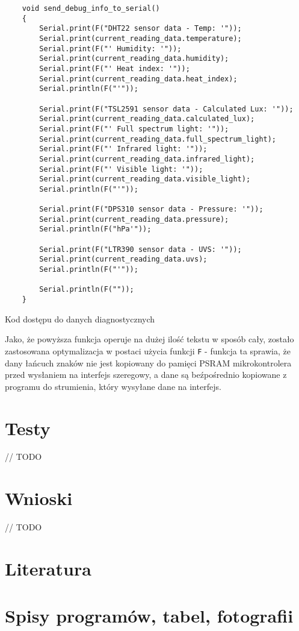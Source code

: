 \documentclass[12pt,a4paper]{article}
\begin{document}
\begin{code}[H]
\begin{verbatim}
    void send_debug_info_to_serial()
    {
        Serial.print(F("DHT22 sensor data - Temp: '"));
        Serial.print(current_reading_data.temperature);
        Serial.print(F("' Humidity: '"));
        Serial.print(current_reading_data.humidity);
        Serial.print(F("' Heat index: '"));
        Serial.print(current_reading_data.heat_index);
        Serial.println(F("'"));
    
        Serial.print(F("TSL2591 sensor data - Calculated Lux: '"));
        Serial.print(current_reading_data.calculated_lux);
        Serial.print(F("' Full spectrum light: '"));
        Serial.print(current_reading_data.full_spectrum_light);
        Serial.print(F("' Infrared light: '"));
        Serial.print(current_reading_data.infrared_light);
        Serial.print(F("' Visible light: '"));
        Serial.print(current_reading_data.visible_light);
        Serial.println(F("'"));
    
        Serial.print(F("DPS310 sensor data - Pressure: '"));
        Serial.print(current_reading_data.pressure);
        Serial.println(F("hPa'"));
    
        Serial.print(F("LTR390 sensor data - UVS: '"));
        Serial.print(current_reading_data.uvs);
        Serial.println(F("'"));
    
        Serial.println(F(""));
    }
\end{verbatim}
\caption{Kod dostępu do danych diagnostycznych}
\label{diagnostic-data-code}
\end{code}

Jako, że powyższa funkcja operuje na dużej ilość tekstu w sposób cały, zostało zastosowana optymalizacja w postaci użycia funkcji 
\texttt{F} - funkcja ta sprawia, że dany łańcuch znaków nie jest kopiowany do pamięci PSRAM mikrokontrolera przed wysłaniem na interfejs szeregowy, 
a dane są beźpośrednio kopiowane z programu do strumienia, który wysyłane dane na interfejs. 

\section{Testy}
// TODO

\section{Wnioski}
// TODO

\section{Literatura}

\printbibliography[heading=none]

\section{Spisy programów, tabel, fotografii}
\listoftables
{}
\end{document}
